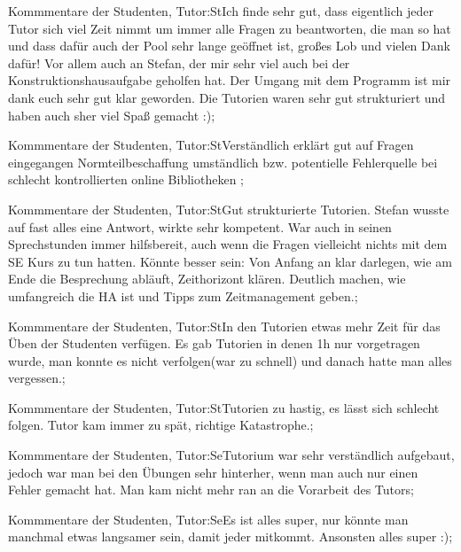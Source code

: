\documentclass[10pt]{beamer}
\begin{document}
\begin{frame}[fragile]{Kommmentare der Studenten, Tutor:St}Ich finde sehr gut, dass eigentlich jeder Tutor sich viel Zeit nimmt um immer alle Fragen zu beantworten, die man so hat und dass dafür auch der Pool sehr lange geöffnet ist, großes Lob und vielen Dank dafür! Vor allem auch an Stefan, der mir sehr viel auch bei der Konstruktionshausaufgabe geholfen hat.  Der Umgang mit dem Programm ist mir dank euch sehr gut klar geworden. Die Tutorien waren sehr gut strukturiert und haben auch sher viel Spaß gemacht :);
 \end{frame}
\begin{frame}[fragile]{Kommmentare der Studenten, Tutor:St}Verständlich erklärt
 gut auf Fragen eingegangen
 Normteilbeschaffung umständlich bzw. potentielle Fehlerquelle bei schlecht kontrollierten online Bibliotheken
 ;
 \end{frame}
\begin{frame}[fragile]{Kommmentare der Studenten, Tutor:St}Gut strukturierte Tutorien. Stefan wusste auf fast alles eine Antwort, wirkte sehr kompetent. War auch in seinen Sprechstunden immer hilfsbereit, auch wenn die Fragen vielleicht nichts mit dem SE Kurs zu tun hatten.
 Könnte besser sein: Von Anfang an klar darlegen, wie am Ende die Besprechung abläuft, Zeithorizont klären. Deutlich machen, wie umfangreich die HA ist und Tipps zum Zeitmanagement geben.;
 \end{frame}
\begin{frame}[fragile]{Kommmentare der Studenten, Tutor:St}In den Tutorien etwas mehr Zeit für das Üben der Studenten verfügen. Es gab Tutorien in denen 1h nur vorgetragen wurde, man konnte es nicht verfolgen(war zu schnell) und danach hatte man alles vergessen.;
 \end{frame}
\begin{frame}[fragile]{Kommmentare der Studenten, Tutor:St}Tutorien zu hastig, es lässt sich schlecht folgen. Tutor kam immer zu spät, richtige Katastrophe.;
 \end{frame}
\begin{frame}[fragile]{Kommmentare der Studenten, Tutor:Se}Tutorium war sehr verständlich aufgebaut, jedoch war man bei den Übungen sehr hinterher, wenn man auch nur einen Fehler gemacht hat. Man kam nicht mehr ran an die Vorarbeit des Tutors;
 \end{frame}
\begin{frame}[fragile]{Kommmentare der Studenten, Tutor:Se}Es ist alles super, nur könnte man manchmal etwas langsamer sein, damit jeder mitkommt. Ansonsten alles super :);
 \end{frame}
\end{document}
